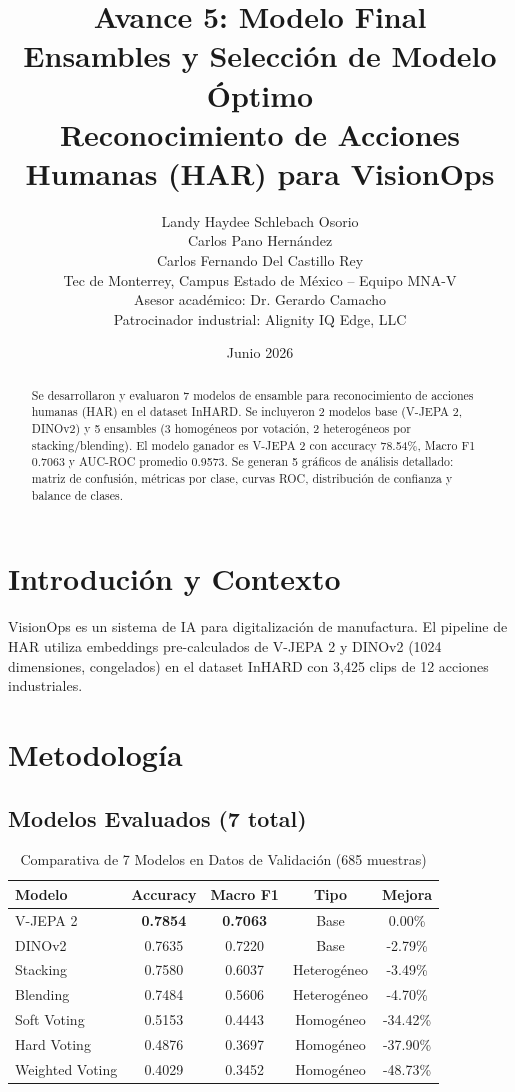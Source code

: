 \documentclass[11pt,letterpaper]{article}
\title{Avance 5: Modelo Final \\
\large Ensambles y Selección de Modelo Óptimo \\
Reconocimiento de Acciones Humanas (HAR) para VisionOps}
\author{
  Landy Haydee Schlebach Osorio \\
  Carlos Pano Hernández \\
  Carlos Fernando Del Castillo Rey \\[0.5em]
  \small Tec de Monterrey, Campus Estado de México -- Equipo MNA-V \\
  \small Asesor académico: Dr. Gerardo Camacho \\
  \small Patrocinador industrial: Alignity IQ Edge, LLC
}
\date{Junio 2026}
\begin{document}
\maketitle

\begin{abstract}
Se desarrollaron y evaluaron 7 modelos de ensamble para reconocimiento de acciones humanas (HAR) en el dataset InHARD. Se incluyeron 2 modelos base (V-JEPA 2, DINOv2) y 5 ensambles (3 homogéneos por votación, 2 heterogéneos por stacking/blending). El modelo ganador es V-JEPA 2 con accuracy 78.54\%, Macro F1 0.7063 y AUC-ROC promedio 0.9573. Se generan 5 gráficos de análisis detallado: matriz de confusión, métricas por clase, curvas ROC, distribución de confianza y balance de clases.
\end{abstract}

\section{Introdución y Contexto}

VisionOps es un sistema de IA para digitalización de manufactura. El pipeline de HAR utiliza embeddings pre-calculados de V-JEPA 2 y DINOv2 (1024 dimensiones, congelados) en el dataset InHARD con 3,425 clips de 12 acciones industriales.

\section{Metodología}

\subsection{Modelos Evaluados (7 total)}

\begin{table}[H]
\centering
\caption{Comparativa de 7 Modelos en Datos de Validación (685 muestras)}
\begin{tabular}{lcccc}
\toprule
\textbf{Modelo} & \textbf{Accuracy} & \textbf{Macro F1} & \textbf{Tipo} & \textbf{Mejora} \\
\midrule
V-JEPA 2 & \textbf{0.7854} & \textbf{0.7063} & Base & 0.00\% \\
DINOv2 & 0.7635 & 0.7220 & Base & -2.79\% \\
Stacking & 0.7580 & 0.6037 & Heterogéneo & -3.49\% \\
Blending & 0.7484 & 0.5606 & Heterogéneo & -4.70\% \\
Soft Voting & 0.5153 & 0.4443 & Homogéneo & -34.42\% \\
Hard Voting & 0.4876 & 0.3697 & Homogéneo & -37.90\% \\
Weighted Voting & 0.4029 & 0.3452 & Homogéneo & -48.73\% \\
\bottomrule
\end{tabular}
\end{table}
\end{document}
